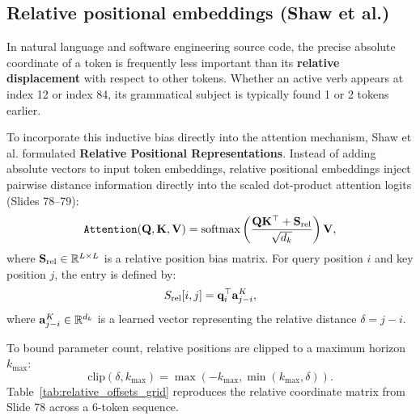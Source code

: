 \documentclass[../../../main.tex]{subfiles}
\begin{document}
\subsection{Relative positional embeddings (Shaw et al.)}
\label{subsec:relative_positional_embeddings_shaw}

In natural language and software engineering source code, the precise absolute coordinate of a token is frequently less important than its \textbf{relative displacement} with respect to other tokens. Whether an active verb appears at index 12 or index 84, its grammatical subject is typically found 1 or 2 tokens earlier.

To incorporate this inductive bias directly into the attention mechanism, Shaw et al. \cite{shaw2018} formulated \textbf{Relative Positional Representations}. Instead of adding absolute vectors to input token embeddings, relative positional embeddings inject pairwise distance information directly into the scaled dot-product attention logits (Slides 78--79):
\begin{equation}
\label{eq:relative_position_attention_ch5}
\text{\texttt{Attention}}(\mathbf{Q}, \mathbf{K}, \mathbf{V}) = \operatorname{\mathrm{softmax}}\left( \frac{\mathbf{Q} \mathbf{K}^\top + \mathbf{S}_{\text{rel}}}{\sqrt{d_k}} \right) \mathbf{V},
\end{equation}
where $\mathbf{S}_{\text{rel}} \in \mathbb{R}^{L \times L}$ is a relative position bias matrix. For query position $i$ and key position $j$, the entry is defined by:
\begin{equation}
\label{eq:shaw_s_rel_entry}
S_{\text{rel}}[i, j] = \mathbf{q}_i^\top \mathbf{a}_{j-i}^K,
\end{equation}
where $\mathbf{a}_{j-i}^K \in \mathbb{R}^{d_k}$ is a learned vector representing the relative distance $\delta = j - i$.

To bound parameter count, relative positions are clipped to a maximum horizon $k_{\max}$:
\begin{equation}
\label{eq:clipping_function_shaw}
\text{clip}(\delta, k_{\max}) = \max(-k_{\max}, \min(k_{\max}, \delta)).
\end{equation}
Table~\ref{tab:relative_offsets_grid} reproduces the relative coordinate matrix from Slide 78 across a 6-token sequence.
\end{document}
